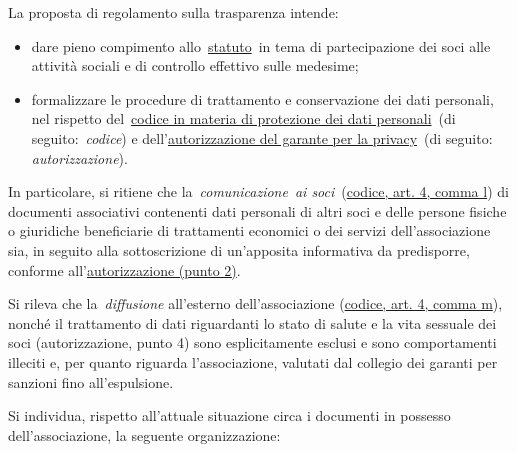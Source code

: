 

La proposta di regolamento sulla trasparenza intende:

\begin{itemize}
    \item
        dare pieno compimento
        allo~\href{http://www.alumniscuolagalileiana.it/wp-content/uploads/2017/03/Statuto-Alumni-SGSS.pdf}{statuto}~in
        tema di partecipazione dei soci alle attività sociali e di controllo
        effettivo sulle medesime;
    \item
        formalizzare le procedure di trattamento e conservazione dei dati
        personali, nel rispetto
        del~\href{http://www.garanteprivacy.it/web/guest/home/docweb/-/docweb-display/docweb/1311248}{codice
        in materia di protezione dei dati personali}~(di
        seguito:~\emph{codice}) e
        dell'\href{http://garanteprivacy.it/web/guest/home/docweb/-/docweb-display/docweb/5803310}{autorizzazione
        del garante per la privacy}~(di seguito: \emph{autorizzazione}).
\end{itemize}

In particolare, si ritiene che la~\emph{comunicazione}~\emph{ai
soci}~(\href{http://www.garanteprivacy.it/web/guest/home/docweb/-/docweb-display/docweb/1311248}{codice,
art. 4, comma l}) di documenti associativi contenenti dati personali di
altri soci e delle persone fisiche o giuridiche beneficiarie di
trattamenti economici o dei servizi dell'associazione sia, in seguito
alla sottoscrizione di un'apposita informativa da predisporre, conforme
all'\href{http://garanteprivacy.it/web/guest/home/docweb/-/docweb-display/docweb/5803310}{autorizzazione
(punto 2)}.

Si rileva che la~\emph{diffusione} all'esterno dell'associazione
(\href{http://www.garanteprivacy.it/web/guest/home/docweb/-/docweb-display/docweb/1311248}{codice,
art. 4, comma m}), nonché il trattamento di dati riguardanti lo stato di
salute e la vita sessuale dei soci (autorizzazione, punto 4) sono
esplicitamente esclusi e sono comportamenti illeciti e, per quanto
riguarda l'associazione, valutati dal collegio dei garanti per sanzioni
fino all'espulsione.

Si individua, rispetto all'attuale situazione circa i documenti in
possesso dell'associazione, la seguente organizzazione:

